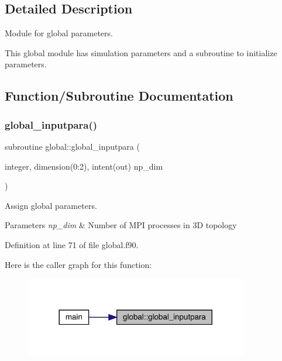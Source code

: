 \subsection{Detailed Description}
Module for global parameters. 

This global module has simulation parameters and a subroutine to initialize parameters. 

\subsection{Function/\+Subroutine Documentation}
\mbox{\label{namespaceglobal_a930b565da2644b675f35b91735e11ce3}} 
\subsubsection{\texorpdfstring{global\_inputpara()}{global\_inputpara()}}
{\footnotesize\ttfamily subroutine global\+::global\+\_\+inputpara (\begin{DoxyParamCaption}\item[{integer, dimension(0\+:2), intent(out)}]{np\+\_\+dim }\end{DoxyParamCaption})}



Assign global parameters. 


\begin{DoxyParams}{Parameters}
{\em np\+\_\+dim} & Number of M\+PI processes in 3D topology \\
\hline
\end{DoxyParams}


Definition at line 71 of file global.\+f90.

Here is the caller graph for this function\+:
\nopagebreak
\begin{figure}[H]
\begin{center}
\leavevmode
\includegraphics[width=276pt]{namespaceglobal_a930b565da2644b675f35b91735e11ce3_icgraph}
\end{center}
\end{figure}


